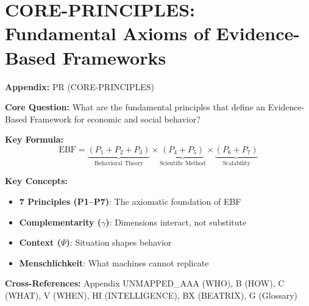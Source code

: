 \chapter{CORE-PRINCIPLES: Fundamental Axioms of Evidence-Based Frameworks}
\label{app:core-principles}


\begin{tcolorbox}[colback=blue!5!white, colframe=blue!75!black,
    title=Quick Reference: Appendix UNMAPPED_PR]

\textbf{Appendix:} PR (CORE-PRINCIPLES)

\textbf{Core Question:} What are the fundamental principles that define an Evidence-Based Framework for economic and social behavior?

\textbf{Key Formula:}
\begin{equation}
\text{EBF} = \underbrace{(P_1 + P_2 + P_3)}_{\text{Behavioral Theory}} \times \underbrace{(P_4 + P_5)}_{\text{Scientific Method}} \times \underbrace{(P_6 + P_7)}_{\text{Scalability}}
\label{eq:pr-ebf}
\end{equation}

\textbf{Key Concepts:}
\begin{itemize}[nosep]
\item \textbf{7 Principles (P1--P7)}: The axiomatic foundation of EBF
\item \textbf{Complementarity ($\gamma$)}: Dimensions interact, not substitute
\item \textbf{Context ($\Psi$)}: Situation shapes behavior
\item \textbf{Menschlichkeit}: What machines cannot replicate
\end{itemize}

\textbf{Cross-References:} Appendix UNMAPPED_AAA (WHO), B (HOW), C (WHAT), V (WHEN), HI (INTELLIGENCE), BX (BEATRIX), G (Glossary)
\end{tcolorbox}


\begin{abstract}
This appendix formalizes the \textbf{seven fundamental principles} that constitute an Evidence-Based Framework (EBF) for economic and social behavior. These principles---Complementarity (P1), Context (P2), Systematik (P3), Evidence (P4), Falsifiability (P5), Human-Machine Complementarity (P6), and Cumulation (P7)---define what distinguishes EBF from ad-hoc behavioral analysis. Together, they form a coherent axiomatic system that guides all EBF applications.
\end{abstract}



